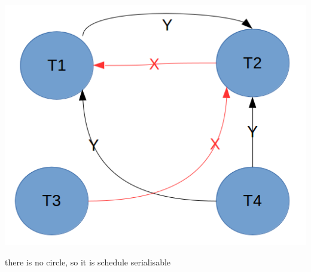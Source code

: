 \documentclass[11pt, a4paper]{article}
\begin{document}
\begin{enumerate}
\begin{center}
        \includegraphics[scale=0.7]{42}
    \end{center}
    there is no circle, so it is schedule serialisable
\end{enumerate}
\end{document}

